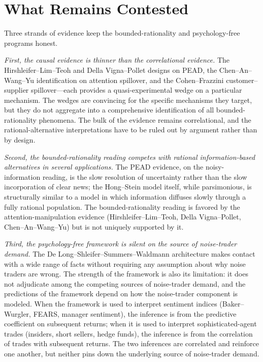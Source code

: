 \section{What Remains Contested}
\label{sec:attcontested}

Three strands of evidence keep the bounded-rationality and psychology-free programs honest.

\emph{First, the causal evidence is thinner than the correlational evidence.} The Hirshleifer--Lim--Teoh and Della Vigna--Pollet designs on PEAD, the Chen--An--Wang--Yu identification on attention spillover, and the Cohen--Frazzini customer--supplier spillover---each provides a quasi-experimental wedge on a particular mechanism. The wedges are convincing for the specific mechanisms they target, but they do not aggregate into a comprehensive identification of all bounded-rationality phenomena. The bulk of the evidence remains correlational, and the rational-alternative interpretations have to be ruled out by argument rather than by design.

\emph{Second, the bounded-rationality reading competes with rational information-based alternatives in several applications.} The PEAD evidence, on the noisy-information reading, is the slow resolution of uncertainty rather than the slow incorporation of clear news; the Hong--Stein model itself, while parsimonious, is structurally similar to a model in which information diffuses slowly through a fully rational population. The bounded-rationality reading is favored by the attention-manipulation evidence (Hirshleifer--Lim--Teoh, Della Vigna--Pollet, Chen--An--Wang--Yu) but is not uniquely supported by it.

\emph{Third, the psychology-free framework is silent on the source of noise-trader demand.} The De Long--Shleifer--Summers--Waldmann architecture makes contact with a wide range of facts without requiring any assumption about why noise traders are wrong. The strength of the framework is also its limitation: it does not adjudicate among the competing sources of noise-trader demand, and the predictions of the framework depend on how the noise-trader component is modeled. When the framework is used to interpret sentiment indices (Baker--Wurgler, FEARS, manager sentiment), the inference is from the predictive coefficient on subsequent returns; when it is used to interpret sophisticated-agent trades (insiders, short sellers, hedge funds), the inference is from the correlation of trades with subsequent returns. The two inferences are correlated and reinforce one another, but neither pins down the underlying source of noise-trader demand.

